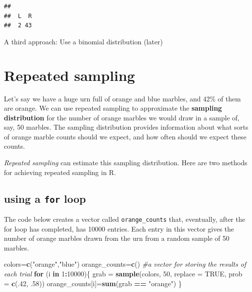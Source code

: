 \documentclass[
]{book}
\newenvironment{Shaded}{\begin{snugshade}}{\end{snugshade}}
\newcommand{\AttributeTok}[1]{\textcolor[rgb]{0.13,0.29,0.53}{#1}}
\newcommand{\CommentTok}[1]{\textcolor[rgb]{0.56,0.35,0.01}{\textit{#1}}}
\newcommand{\ConstantTok}[1]{\textcolor[rgb]{0.56,0.35,0.01}{#1}}
\newcommand{\ControlFlowTok}[1]{\textcolor[rgb]{0.13,0.29,0.53}{\textbf{#1}}}
\newcommand{\DecValTok}[1]{\textcolor[rgb]{0.00,0.00,0.81}{#1}}
\newcommand{\FunctionTok}[1]{\textcolor[rgb]{0.13,0.29,0.53}{\textbf{#1}}}
\newcommand{\NormalTok}[1]{#1}
\newcommand{\OtherTok}[1]{\textcolor[rgb]{0.56,0.35,0.01}{#1}}
\newcommand{\SpecialCharTok}[1]{\textcolor[rgb]{0.81,0.36,0.00}{\textbf{#1}}}
\newcommand{\StringTok}[1]{\textcolor[rgb]{0.31,0.60,0.02}{#1}}
\theoremstyle{definition}
\theoremstyle{definition}
\theoremstyle{definition}
\theoremstyle{definition}
\theoremstyle{remark}
\begin{document}
\begin{verbatim}
## 
##  L  R 
##  2 43
\end{verbatim}

A third approach: Use a binomial distribution (later)

\section{Repeated sampling}\label{repeated-sampling}

Let's say we have a huge urn full of orange and blue marbles, and 42\% of them are orange. We can use repeated sampling to approximate the \textbf{sampling distribution} for the number of orange marbles we would draw in a sample of, say, 50 marbles.
The sampling distribution provides information about what sorts of orange marble counts should we expect, and how often should we expect these counts.

\emph{Repeated sampling} can estimate this sampling distribution. Here are two methods for achieving repeated sampling in R.

\subsection*{\texorpdfstring{using a \texttt{for} loop}{using a for loop}}\label{using-a-for-loop}

The code below creates a vector called \texttt{orange\_counts} that, eventually, after the for loop has completed, has 10000 entries. Each entry in this vector gives the number of orange marbles drawn from the urn from a random sample of 50 marbles.

\begin{Shaded}
\begin{Highlighting}[]
\NormalTok{colors}\OtherTok{=}\FunctionTok{c}\NormalTok{(}\StringTok{"orange"}\NormalTok{,}\StringTok{"blue"}\NormalTok{)}
\NormalTok{orange\_counts}\OtherTok{=}\FunctionTok{c}\NormalTok{() }\CommentTok{\#a vector for storing the results of each trial}
\ControlFlowTok{for}\NormalTok{ (i }\ControlFlowTok{in} \DecValTok{1}\SpecialCharTok{:}\DecValTok{10000}\NormalTok{)\{}
\NormalTok{  grab }\OtherTok{=} \FunctionTok{sample}\NormalTok{(colors, }\DecValTok{50}\NormalTok{, }\AttributeTok{replace =} \ConstantTok{TRUE}\NormalTok{, }\AttributeTok{prob =} \FunctionTok{c}\NormalTok{(.}\DecValTok{42}\NormalTok{, .}\DecValTok{58}\NormalTok{))}
\NormalTok{  orange\_counts[i]}\OtherTok{=}\FunctionTok{sum}\NormalTok{(grab }\SpecialCharTok{==} \StringTok{"orange"}\NormalTok{)}
\NormalTok{\}}
\end{Highlighting}
\end{Shaded}
\end{document}
